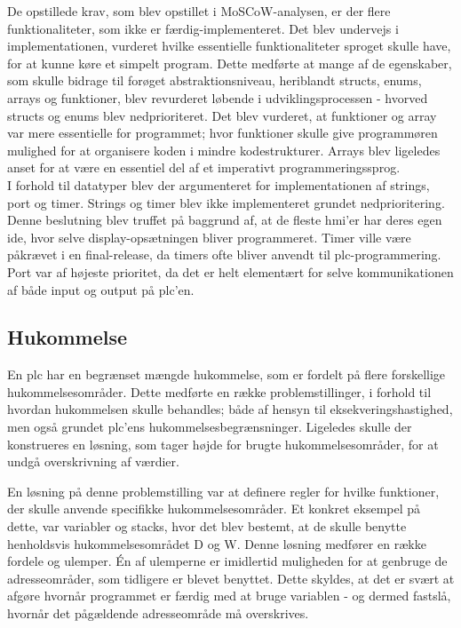 \noindent De opstillede krav, som blev opstillet i MoSCoW-analysen, er der flere funktionaliteter, som ikke er færdig-implementeret. Det blev undervejs i implementationen, vurderet hvilke essentielle funktionaliteter sproget skulle have, for at kunne køre et simpelt program. Dette medførte at mange af de egenskaber, som skulle bidrage til forøget abstraktionsniveau, heriblandt structs, enums, arrays og funktioner, blev revurderet løbende i udviklingsprocessen - hvorved structs og enums blev nedprioriteret. Det blev vurderet, at funktioner og array var mere essentielle for programmet; hvor funktioner skulle give programmøren mulighed for at organisere koden i mindre kodestrukturer. Arrays blev ligeledes anset for at være en essentiel del af et imperativt programmeringssprog. \\

\noindent I forhold til datatyper blev der argumenteret for implementationen af strings, port og timer. Strings og timer blev ikke implementeret grundet nedprioritering. Denne beslutning blev truffet på baggrund af, at de fleste \gls{hmi}'er har deres egen \gls{ide}, hvor selve display-opsætningen bliver programmeret. Timer ville være påkrævet i en final-release, da timers ofte bliver anvendt til \gls{plc}-programmering. 
Port var af højeste prioritet, da det er helt elementært for selve kommunikationen af både input og output på \gls{plc}'en. 

\subsection*{Hukommelse}
En \gls{plc} har en begrænset mængde hukommelse, som er fordelt på flere forskellige hukommelsesområder. 
Dette medførte en række problemstillinger, i forhold til hvordan hukommelsen skulle behandles; både af hensyn til eksekveringshastighed, men også grundet \gls{plc}'ens hukommelsesbegrænsninger. Ligeledes skulle der konstrueres en løsning, som tager højde for brugte hukommelsesområder, for at undgå overskrivning af værdier. 

En løsning på denne problemstilling var at definere regler for hvilke funktioner, der skulle anvende specifikke hukommelsesområder. Et konkret eksempel på dette, var variabler og stacks, hvor det blev bestemt, at de skulle benytte henholdsvis hukommelsesområdet D og W. 
Denne løsning medfører en række fordele og ulemper. Én af ulemperne er imidlertid muligheden for at genbruge de adresseområder, som tidligere er blevet benyttet. Dette skyldes, at det er svært at afgøre hvornår programmet er færdig med at bruge variablen - og dermed fastslå, hvornår det pågældende adresseområde må overskrives. \\

